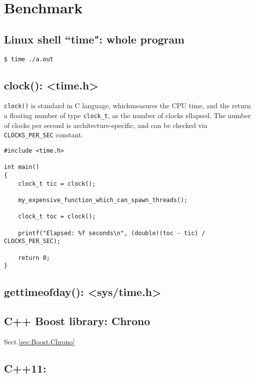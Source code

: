 \chapter{Benchmark}


\section{Linux shell ``time": whole program}


\begin{lstlisting}
$ time ./a.out
\end{lstlisting}


\section{clock(): <time.h>}
\label{sec:clock()_C}


\verb!clock()! is standard in C language, whichmeasures the CPU time, and the
return a floating number of type \verb!clock_t!, as the number of clocks
ellapsed.
The number of clocks per second is architecture-specific, and can be checked via
\verb!CLOCKS_PER_SEC! constant.

\begin{lstlisting}
#include <time.h>

int main()
{
    clock_t tic = clock();

    my_expensive_function_which_can_spawn_threads();

    clock_t toc = clock();

    printf("Elapsed: %f seconds\n", (double)(toc - tic) / CLOCKS_PER_SEC);

    return 0;
}
\end{lstlisting}


\section{gettimeofday(): <sys/time.h>}	


\section{C++ Boost library: Chrono}

Sect.\ref{sec:Boost.Chrono}


\section{C++11: }